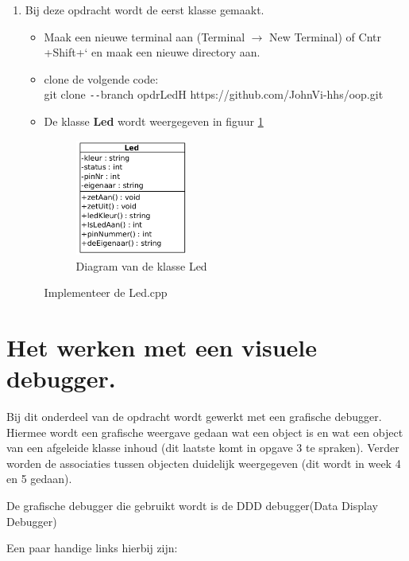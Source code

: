 \begin{enumerate}
\item Bij deze opdracht wordt de eerst klasse gemaakt.
\begin{itemize}
	\item Maak een nieuwe terminal aan (Terminal $\rightarrow$ New Terminal) of Cntr +Shift+` en maak een nieuwe directory aan.
	\item clone de volgende code:\\
	 git clone \verb|--|branch opdrLedH https://github.com/JohnVi-hhs/oop.git
	\item De klasse \textbf{Led} wordt weergegeven in figuur \ref{fig:klassLed}
		\begin{figure}[h!]
		\centering
		\begin{center} 	
			\includegraphics[width=0.37\textwidth]{figuren/klasseLedOpg1}
			\caption{Diagram van de klasse Led}
			\label{fig:klassLed}   
		\end{center}
	\end{figure}
	
	Implementeer de Led.cpp
	
\end{itemize}


    \end{enumerate}


\section{Het werken met een visuele debugger.}
 
Bij dit onderdeel van de opdracht wordt gewerkt met een grafische debugger. Hiermee wordt een grafische weergave gedaan wat een object is en wat een object van een afgeleide klasse inhoud (dit laatste komt in opgave 3 te spraken). Verder worden de associaties tussen objecten duidelijk weergegeven (dit wordt in week 4 en 5 gedaan).

De grafische debugger die gebruikt wordt is de DDD debugger(Data Display Debugger) 


Een paar handige links hierbij zijn:


